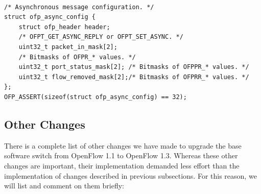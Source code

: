 \begin{lstlisting}[caption={Ethernet parsing in the nbee_link module}, label=asyncmessage,]    

/* Asynchronous message configuration. */
struct ofp_async_config {
    struct ofp_header header;
    /* OFPT_GET_ASYNC_REPLY or OFPT_SET_ASYNC. */
    uint32_t packet_in_mask[2];
    /* Bitmasks of OFPR_* values. */
    uint32_t port_status_mask[2]; /* Bitmasks of OFPPR_* values. */
    uint32_t flow_removed_mask[2];/* Bitmasks of OFPRR_* values. */
};
OFP_ASSERT(sizeof(struct ofp_async_config) == 32);

\end{lstlisting}

\subsection{Other Changes}
\label{sec:sec46}

There is a complete list of other changes we have made to upgrade the base software switch from OpenFlow 1.1 to OpenFlow 1.3. Whereas these other changes are important, their implementation demanded less effort than the implementation of changes described in previous subsections. For this reason, we will list and comment on them briefly:

